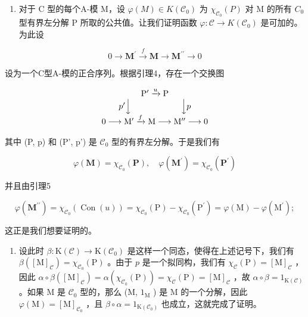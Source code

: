 \begin{enumerate}
\def\labelenumi{\alph{enumi})}
\setcounter{enumi}{1}
\tightlist
\item
  对于 C 型的每个A-模 M，设 \(\varphi(M) \in K(\mathcal{C}_{0})\) 为 \(\chi_{\mathcal{C}_{0}}(P)\) 对 M 的所有 \(C_{0}\) 型有界左分解 P 所取的公共值。让我们证明函数 \(\varphi : \mathcal{C} \to K(\mathcal{C}_{0})\) 是可加的。为此设
\end{enumerate}

\[
0 \to \mathbf {M} ^ {\prime} \xrightarrow {f} \mathbf {M} \to \mathbf {M} ^ {\prime \prime} \to 0
\]

设为一个C型A-模的正合序列。根据引理4，存在一个交换图

\[
\begin{array}{c} \mathrm{P} ^ {\prime} \xrightarrow {u} \mathrm{P} \\ p ^ {\prime} \Big \downarrow \qquad \qquad \qquad \Big \downarrow p \\ 0 \longrightarrow \mathrm{M} ^ {\prime} \xrightarrow {f} \mathrm{M} \longrightarrow \mathrm{M} ^ {\prime \prime} \longrightarrow 0 \end{array}
\]

其中 (P, p) 和 (P', p') 是 \(\mathcal{C}_0\) 型的有界左分解。于是我们有

\[
\varphi (\mathbf {M}) = \chi_ {\mathcal {C} _ {0}} (\mathbf {P}), \quad \varphi (\mathbf {M} ^ {\prime}) = \chi_ {\mathcal {C} _ {0}} (\mathbf {P} ^ {\prime})
\]

并且由引理5

\[
\varphi (\mathbf {M} ^ {\prime \prime}) = \chi_ {\mathcal {C} _ {0}} (\operatorname{Con} (u)) = \chi_ {\mathcal {C} _ {0}} (\mathrm{P}) - \chi_ {\mathcal {C} _ {0}} (\mathrm{P} ^ {\prime}) = \varphi (\mathrm{M}) - \varphi (\mathrm{M} ^ {\prime});
\]

这正是我们想要证明的。

\begin{enumerate}
\def\labelenumi{\alph{enumi})}
\setcounter{enumi}{2}
\tightlist
\item
  设此时 \(\beta: \mathrm{K}(\mathcal{C}) \to \mathrm{K}(\mathcal{C}_0)\) 是这样一个同态，使得在上述记号下，我们有 \(\beta([\mathrm{M}]_{\mathcal{C}}) = \chi_{\mathcal{C}_0}(\mathrm{P})\) 。由于 \(p\) 是一个拟同构，我们有 \(\chi_{\mathcal{C}}(\mathrm{P}) = [\mathrm{M}]_{\mathcal{C}}\) ，因此 \(\alpha \circ \beta([\mathrm{M}]_{\mathcal{C}}) = \alpha(\chi_{\mathcal{C}_0}(\mathrm{P})) = \chi_{\mathcal{C}}(\mathrm{P}) = [\mathrm{M}]_{\mathcal{C}}\) ，故 \(\alpha \circ \beta = 1_{\mathrm{K}(\mathcal{C})}\) 。如果 M 是 \(\mathcal{C}_0\) 型的，那么 (M, \(1_{\mathrm{M}}\) ) 是 M 的一个分解，因此 \(\varphi(\mathrm{M}) = [\mathrm{M}]_{\mathcal{C}_0}\) ，且 \(\beta \circ \alpha = 1_{\mathrm{K}(\mathcal{C}_0)}\) 也成立，这就完成了证明。
\end{enumerate}

